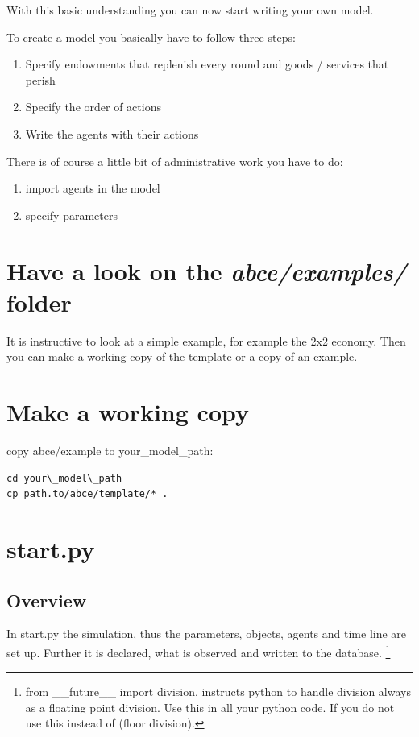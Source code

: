 \documentclass[letterpaper,10pt,english]{sphinxmanual}
\begin{document}
With this basic understanding you can now start writing your own model.

To create a model you basically have to follow three steps:
\begin{enumerate}
\item {} 
Specify endowments that replenish every round and goods / services that perish

\item {} 
Specify the order of actions

\item {} 
Write the agents with their actions

\end{enumerate}

There is of course a little bit of administrative work you have to do:
\begin{enumerate}
\item {} 
import agents in the model

\item {} 
specify parameters

\end{enumerate}


\section{Have a look on the \emph{abce/examples/} folder}
\label{Walk_through:have-a-look-on-the-abce-examples-folder}
It is instructive to look at a simple example, for example the 2x2 economy.
Then you can make a working copy of the template or a copy of an example.


\section{Make a working copy}
\label{Walk_through:make-a-working-copy}
copy abce/example to your\_model\_path:

\begin{Verbatim}[commandchars=\\\{\}]
cd your\_model\_path
cp path.to/abce/template/* .
\end{Verbatim}


\section{start.py}
\label{Walk_through:start-py}

\subsection{Overview}
\label{Walk_through:overview}
In start.py the simulation, thus the parameters, objects, agents and time line are
set up. Further it is declared, what is observed and written to the database. \footnote{
from \_\_future\_\_ import division, instructs python to handle division always as a
floating point division. Use this in all your python code. If you do not use this  instead
of  (floor division).
}
\end{document}

